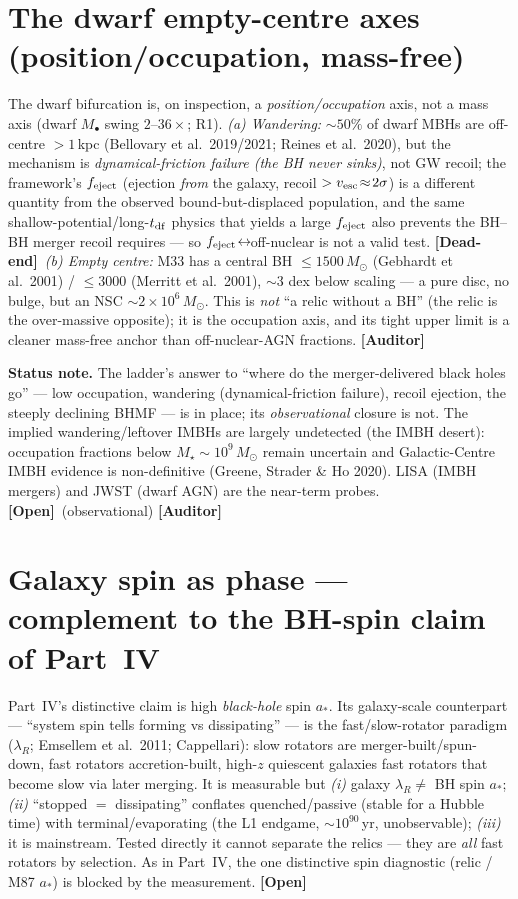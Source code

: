 \documentclass[11pt]{article}
\newcommand{\Dead}{\textbf{\textcolor{red!65!black}{[Dead-end]}}}
\newcommand{\Open}{\textbf{\textcolor{gray!10!black}{[Open]}}}
\newcommand{\Auditor}{\textbf{\textcolor{teal!55!black}{[Auditor]}}}
\newcommand{\msun}{M_\odot}
\newcommand{\Mbh}{M_{\bullet}}
\begin{document}
\section{The dwarf empty-centre axes (position/occupation, mass-free)}
The dwarf bifurcation is, on inspection, a \emph{position/occupation} axis, not a mass axis (dwarf $\Mbh$ swing $2$--$36\times$; R1). \emph{(a) Wandering:} $\sim50\%$ of dwarf MBHs are off-centre $>1$\,kpc (Bellovary et al.\ 2019/2021; Reines et al.\ 2020), but the mechanism is \emph{dynamical-friction failure (the BH never sinks)}, not GW recoil; the framework's $f_{\rm eject}$ (ejection \emph{from} the galaxy, recoil $>v_{\rm esc}\!\approx\!2\sigma$) is a different quantity from the observed bound-but-displaced population, and the same shallow-potential/long-$t_{\rm df}$ physics that yields a large $f_{\rm eject}$ also prevents the BH--BH merger recoil requires --- so $f_{\rm eject}\!\leftrightarrow\!$off-nuclear is not a valid test. \Dead\ \emph{(b) Empty centre:} M33 has a central BH $\le1500\,\msun$ (Gebhardt et al.\ 2001) / $\le3000$ (Merritt et al.\ 2001), $\sim3$ dex below scaling --- a pure disc, no bulge, but an NSC $\sim2\times10^6\,\msun$. This is \emph{not} ``a relic without a BH'' (the relic is the over-massive opposite); it is the occupation axis, and its tight upper limit is a cleaner mass-free anchor than off-nuclear-AGN fractions. \Auditor



\textbf{Status note.} The ladder's answer to ``where do the merger-delivered black holes go'' --- low occupation, wandering (dynamical-friction failure), recoil ejection, the steeply declining BHMF --- is in place; its \emph{observational} closure is not. The implied wandering/leftover IMBHs are largely undetected (the IMBH desert): occupation fractions below $M_\star\!\sim\!10^9\,\msun$ remain uncertain and Galactic-Centre IMBH evidence is non-definitive (Greene, Strader \& Ho 2020). LISA (IMBH mergers) and JWST (dwarf AGN) are the near-term probes. \Open\ (observational) \Auditor

\section{Galaxy spin as phase --- complement to the BH-spin claim of Part~IV}
Part~IV's distinctive claim is high \emph{black-hole} spin $a_\ast$. Its galaxy-scale counterpart --- ``system spin tells forming vs dissipating'' --- is the fast/slow-rotator paradigm ($\lambda_R$; Emsellem et al.\ 2011; Cappellari): slow rotators are merger-built/spun-down, fast rotators accretion-built, high-$z$ quiescent galaxies fast rotators that become slow via later merging. It is measurable but \emph{(i)} galaxy $\lambda_R\!\neq\!$ BH spin $a_\ast$; \emph{(ii)} ``stopped $=$ dissipating'' conflates quenched/passive (stable for a Hubble time) with terminal/evaporating (the L1 endgame, $\sim10^{90}$\,yr, unobservable); \emph{(iii)} it is mainstream. Tested directly it cannot separate the relics --- they are \emph{all} fast rotators by selection. As in Part~IV, the one distinctive spin diagnostic (relic / M87 $a_\ast$) is blocked by the measurement. \Open
\end{document}
